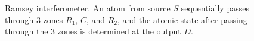 \begin{figure}
\centering



\caption{Ramsey interferometer. An atom from source $S$ sequentially passes through 3 zones $R_1$, $C$, and $R_2$, and the atomic state after passing through the 3 zones is determined at the output $D$.}
\label{figPart1RamsiInterferometer}
\end{figure}